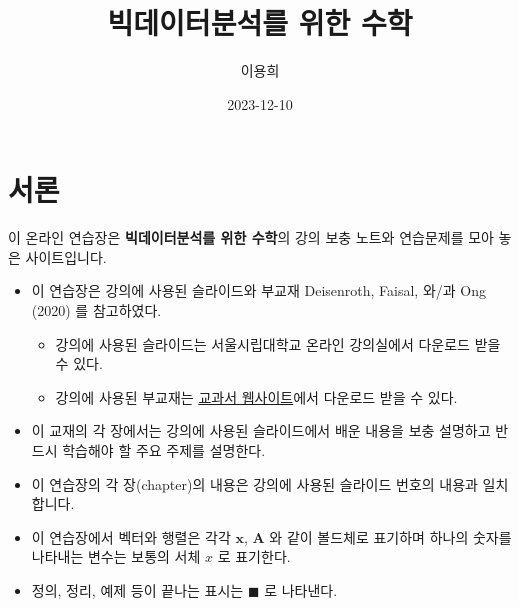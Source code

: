 \documentclass[
  11pt,
  a4paper,
  oneside]{scrbook}
\title{빅데이터분석를 위한 수학}
\author{이용희}
\date{2023-12-10}
\providecommand{\tightlist}{%
  \setlength{\itemsep}{0pt}\setlength{\parskip}{0pt}}\usepackage{longtable,booktabs,array}
\renewcommand*\contentsname{목차}
\newcommand\contentsname{목차}
\theoremstyle{definition}
\theoremstyle{definition}
\theoremstyle{plain}
\theoremstyle{remark}
\begin{document}
\frontmatter
\maketitle
\renewcommand*\contentsname{목차}
{
\setcounter{tocdepth}{2}
\tableofcontents
}
\mainmatter
{}

\chapter*{서론}\label{uxc11cuxb860}


이 온라인 연습장은 \textbf{빅데이터분석를 위한 수학}의 강의 보충 노트와
연습문제를 모아 놓은 사이트입니다.

\begin{itemize}
\item
  이 연습장은 강의에 사용된 슬라이드와 부교재 Deisenroth, Faisal, 와/과
  Ong (2020) 를 참고하였다.

  \begin{itemize}
  \tightlist
  \item
    강의에 사용된 슬라이드는 서울시립대학교 온라인 강의실에서 다운로드
    받을 수 있다.
  \item
    강의에 사용된 부교재는 \href{https://mml-book.github.io/}{교과서
    웹사이트}에서 다운로드 받을 수 있다.
  \end{itemize}
\item
  이 교재의 각 장에서는 강의에 사용된 슬라이드에서 배운 내용을 보충
  설명하고 반드시 학습해야 할 주요 주제를 설명한다.
\end{itemize}

\begin{tcolorbox}[enhanced jigsaw, colback=white, colframe=quarto-callout-note-color-frame, opacityback=0, toprule=.15mm, leftrule=.75mm, titlerule=0mm, opacitybacktitle=0.6, title=\textcolor{quarto-callout-note-color}{\faInfo}\hspace{0.5em}{노트}, colbacktitle=quarto-callout-note-color!10!white, breakable, bottomrule=.15mm, bottomtitle=1mm, toptitle=1mm, arc=.35mm, left=2mm, rightrule=.15mm, coltitle=black]

\begin{itemize}
\item
  이 연습장의 각 장(chapter)의 내용은 강의에 사용된 슬라이드 번호의
  내용과 일치합니다.
\item
  이 연습장에서 벡터와 행렬은 각각 \(\pmb x\), \(\pmb A\) 와 같이
  볼드체로 표기하며 하나의 숫자를 나타내는 변수는 보통의 서체 \(x\) 로
  표기한다.
\item
  정의, 정리, 예제 등이 끝나는 표시는 \(\blacksquare\) 로 나타낸다.
\end{itemize}

\end{tcolorbox}
\end{document}
